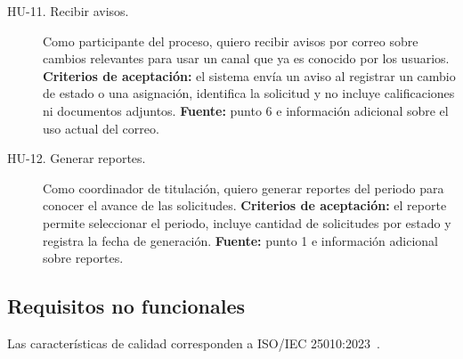 \begin{description}
    \item[HU-11. Recibir avisos.] Como participante del proceso, quiero recibir
    avisos por correo sobre cambios relevantes para usar un canal que ya es
    conocido por los usuarios.
    \textbf{Criterios de aceptación:} el sistema envía un aviso al registrar un
    cambio de estado o una asignación, identifica la solicitud y no incluye
    calificaciones ni documentos adjuntos. \textbf{Fuente:} punto 6 e
    información adicional sobre el uso actual del correo.

    \item[HU-12. Generar reportes.] Como coordinador de titulación, quiero
    generar reportes del periodo para conocer el avance de las solicitudes.
    \textbf{Criterios de aceptación:} el reporte permite seleccionar el
    periodo, incluye cantidad de solicitudes por estado y registra la fecha de
    generación. \textbf{Fuente:} punto 1 e información adicional sobre
    reportes.
\end{description}

\subsection{Requisitos no funcionales}

Las características de calidad corresponden a ISO/IEC 25010:2023~\cite{ISOIEC25010_2023}.

